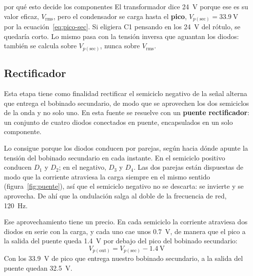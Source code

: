 \documentclass[11pt,a4paper]{article}
\begin{document}
\begin{notatec}{por qué esto decide los componentes}
El transformador dice \qty{24}{\volt} porque ese es su valor eficaz, $V_{\text{rms}}$,
pero el condensador se carga hasta el \textbf{pico}, $V_{p(\text{sec})}=\qty{33.9}{\volt}$
por la ecuación~\eqref{eq:pico-sec}. Si eligiera C1 pensando en los \qty{24}{\volt} del
rótulo, se quedaría corto. Lo mismo pasa con la tensión inversa que aguantan los diodos:
también se calcula sobre $V_{p(\text{sec})}$, nunca sobre $V_{\text{rms}}$.
\end{notatec}

\subsection{Rectificador}
Esta etapa tiene como finalidad rectificar el semiciclo negativo de la señal alterna que
entrega el bobinado secundario, de modo que se aprovechen los dos semiciclos de la onda y
no solo uno. En esta fuente se resuelve con un \textbf{puente rectificador}: un conjunto
de cuatro diodos conectados en puente, encapsulados en un solo componente.

Lo consigue porque los diodos conducen por parejas, según hacia dónde apunte la tensión
del bobinado secundario en cada instante. En el semiciclo positivo conducen $D_1$ y $D_2$;
en el negativo, $D_3$ y $D_4$. Las dos parejas están dispuestas de modo que la corriente
atraviesa la carga siempre en el mismo sentido (figura~\ref{fig:puente}), así que el
semiciclo negativo no se descarta: se invierte y se aprovecha. De ahí que la ondulación
salga al doble de la frecuencia de red, \qty{120}{\hertz}.

Ese aprovechamiento tiene un precio. En cada semiciclo la corriente atraviesa dos diodos
en serie con la carga, y cada uno cae unos \qty{0.7}{\volt}, de manera que el pico a la
salida del puente queda \qty{1.4}{\volt} por debajo del pico del bobinado secundario:
\begin{equation}
  V_{p(\text{out})}=V_{p(\text{sec})}-\qty{1.4}{\volt}
  \label{eq:vpout}
\end{equation}
Con los \qty{33.9}{\volt} de pico que entrega nuestro bobinado secundario, a la salida del
puente quedan \qty{32.5}{\volt}.
\end{document}
